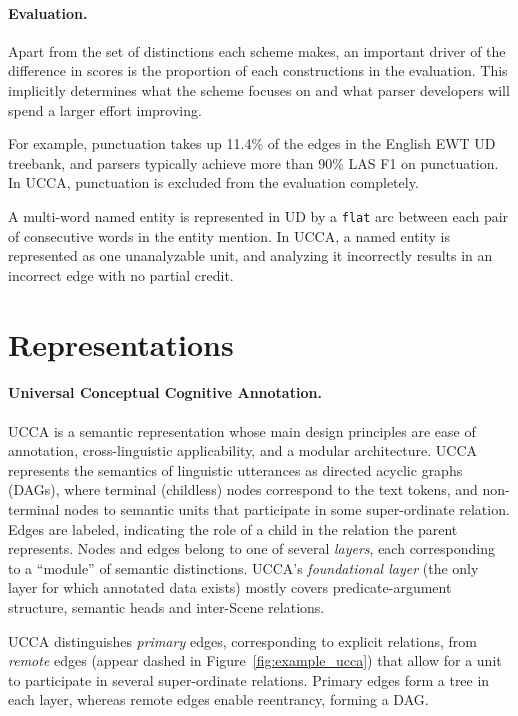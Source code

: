 \documentclass[11pt,a4paper]{article}
\begin{document}
\paragraph{Evaluation.}

Apart from the set of distinctions each scheme makes,
an important driver of the difference in scores is the proportion of each constructions
in the evaluation.
This implicitly determines what the scheme focuses on and what parser developers
will spend a larger effort improving.

For example, punctuation takes up 11.4\% of the edges in the English EWT UD treebank,
and parsers typically achieve more than 90\% LAS F1 on punctuation.
In UCCA, punctuation is excluded from the evaluation completely.

A multi-word named entity is represented in UD by a \verb|flat| arc between
each pair of consecutive words in the entity mention.
In UCCA, a named entity is represented as one unanalyzable unit, and analyzing it
incorrectly results in an incorrect edge with no partial credit.



\section{Representations}\label{sec:representations}

\paragraph{Universal Conceptual Cognitive Annotation.}\label{sec:ucca}
UCCA \cite{abend2013universal} is a semantic representation whose main design principles
are ease of annotation, cross-linguistic applicability, and a modular architecture.
UCCA represents the semantics of linguistic utterances
as directed acyclic graphs (DAGs), where terminal (childless) nodes
correspond to the text tokens, and non-terminal nodes to semantic units that participate
in some super-ordinate relation.
Edges are labeled, indicating the role of a child in the relation the parent represents.
Nodes and edges belong to one of several \textit{layers}, each corresponding
to a ``module'' of semantic distinctions.
UCCA's \textit{foundational layer} (the only layer for which annotated data exists)
mostly covers predicate-argument structure, semantic heads and inter-Scene relations.

UCCA distinguishes \textit{primary} edges, corresponding 
to explicit relations, from \textit{remote} edges (appear dashed in
Figure~\ref{fig:example_ucca}) that allow for a unit to participate
in several super-ordinate relations.
Primary edges form a tree in each layer, whereas remote edges enable reentrancy, forming a DAG.
\end{document}
